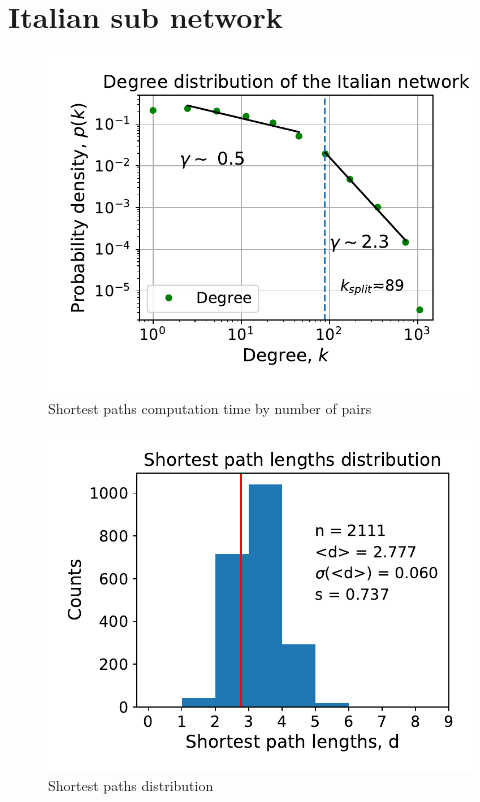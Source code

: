 \documentclass[11pt, twoside]{report}
\begin{document}
\section{Italian sub network}
\begin{minipage}[b]{0.5\textwidth}
   \centering
    \begin{figure}[H]
      \includegraphics[width=\textwidth]{../../scripts/network_analysis/imgs/tot_degree_distribution_ita.pdf}            
          \caption{Shortest paths computation time by number of pairs}
      \label{fig:path_time}
\end{figure}
\end{minipage}
\begin{minipage}[b]{0.5\textwidth}
  \begin{figure}[H]
  \centering
      \includegraphics[width=\textwidth]{../../scripts/network_analysis/imgs/paths_hist_ita.pdf}            
        \caption{Shortest paths distribution}
\end{figure}
\end{minipage}
\end{document}
